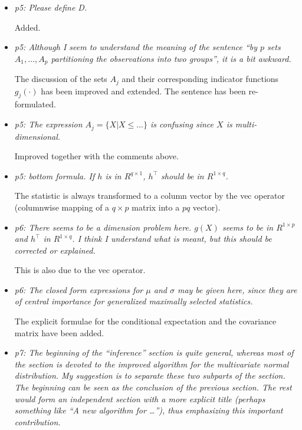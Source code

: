 \documentclass[11pt,a4paper]{article}
\begin{document}
\begin{itemize}
  
  \item \textit{p5: Please define D.}
        
	Added.
	
  \item \textit{p5: Although I seem to understand the meaning of the sentence
        ``by $p$ sets $A_1, \dots , A_p$ partitioning the observations into two
	groups'', it is a bit awkward.}
	
	The discussion of the sets $A_j$ and their corresponding indicator functions
	$g_j(\cdot)$ has been improved and extended. The sentence has been re-formulated.
	
  \item \textit{p5: The expression $A_j = \{ X | X \le \dots\}$ is confusing since
        $X$ is multi-dimensional.}
	
	Improved together with the comments above.
	
  \item \textit{p5: bottom formula. If $h$ is in $R^{q \times 1}$, $h^\top$ should be
        in $R^{1 \times q}$.}
	
	The statistic is always transformed to a column vector by the vec operator
        (columnwise mapping of a $q \times p$ matrix into a $pq$ vector).
	
  \item \textit{p6: There seems to be a dimension problem here. $g(X)$ seems to be
        in $R^{1 \times p}$ and $h^\top$ in $R^{1 \times q}$. I think I understand
	what is meant, but this should be corrected or explained.}
	
	This is also due to the vec operator.
	
  \item \textit{p6: The closed form expressions for $\mu$ and $\sigma$ may be
        given here, since they are of central importance for generalized maximally
	selected statistics.}
	
	The explicit formulae for the conditional expectation and the covariance matrix
	have been added.
	
  \item \textit{p7: The beginning of the ``inference'' section is quite general,
        whereas most of the section is devoted to the improved algorithm for the
	multivariate normal distribution. My suggestion is to separate these two
	subparts of the section. The beginning can be seen as the conclusion of
	the previous section. The rest would form an independent section with a
	more explicit title (perhaps something like ``A new algorithm for \dots''),
	thus emphasizing this important contribution.}
	

\end{itemize}
\end{document}
